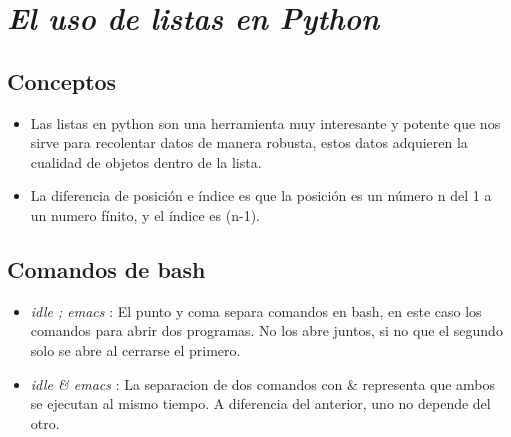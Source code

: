 \documentclass{book}
\begin{document}
	
	
	




	\section{\textit{El uso de listas en Python}}

\begin{flushright}
	\date{18 de enero de 2019}
\end{flushright}

	\subsection {Conceptos}
	\begin{itemize}
		\item Las listas en python son una herramienta muy interesante y potente que nos sirve para recolentar datos de manera robusta, estos datos adquieren la cualidad de objetos dentro de la lista.
		\item La diferencia de posición e índice es que la posición es un número n del 1 a un numero fínito, y el índice es (n-1).
	\end{itemize}
	
	\subsection {Comandos de bash}
	\begin{itemize}
		\item {\textit{idle ; emacs} }: El punto y coma separa comandos en bash, en este caso los comandos para abrir dos programas. No los abre juntos, si no que el segundo solo se abre al cerrarse el primero.
		\item {\textit{idle \& emacs}} : La separacion de dos comandos con \& representa que ambos se ejecutan al mismo tiempo. A diferencia del anterior, uno no depende del otro.
	\end{itemize}
	
\end{document}
